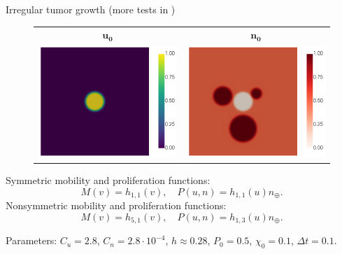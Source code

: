 \begin{frame}{Irregular tumor growth {\footnotesize (more tests in \cite{acosta2023structure})}}
	\footnotesize
	\begin{figure}
		\centering
		\begin{tabular}{cc}
			\hspace*{-1.1cm}$\boldsymbol{u_0}$ & \hspace*{-1.1cm}$\boldsymbol{n_0}$\\
			\includegraphics[scale=0.2]{img/irregular_shape/initial_cond/tumor_DG-UPW_Pi1_u_i-0_cropped.png} &
			\includegraphics[scale=0.2]{img/irregular_shape/initial_cond/tumor_DG-UPW_Pi1_n_i-0_cropped.png}
		\end{tabular}
	\end{figure}

	Symmetric mobility and proliferation functions:
	$$
	M(v)=h_{1,1}(v),\quad P(u,n)=h_{1,1}(u)n_\oplus.
	$$
	Nonsymmetric mobility and proliferation functions:
	$$
	M(v)=h_{5,1}(v),\quad P(u,n)=h_{1,3}(u) n_\oplus.
	$$

	Parameters: $C_u=2.8$, $C_n=2.8\cdot 10^{-4}$, $h\approx 0.28$, $P_0=0.5$, $\chi_0=0.1$, $\Delta t=0.1$.
\end{frame}
